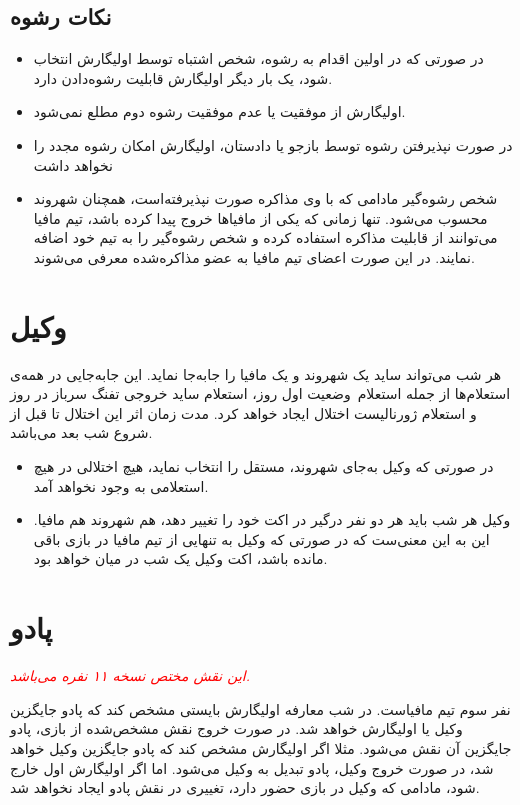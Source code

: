 \documentclass[12pt]{extarticle}
\begin{document}
\subsection{نکات رشوه}
\begin{itemize}
	\item
	      در صورتی که در اولین اقدام به رشوه، شخص اشتباه توسط اولیگارش انتخاب شود، یک بار دیگر اولیگارش قابلیت رشوه‌دادن دارد.
	\item
	      اولیگارش از موفقیت یا عدم موفقیت رشوه دوم مطلع نمی‌شود.
	\item
	      در صورت نپذیرفتن رشوه توسط بازجو یا دادستان، اولیگارش امکان رشوه مجدد را نخواهد داشت
	\item
	      شخص رشوه‌گیر مادامی که با وی مذاکره صورت نپذیرفته‌است، همچنان شهروند محسوب می‌شود. تنها زمانی که یکی از مافیاها خروج پیدا کرده باشد، تیم مافیا می‌توانند از قابلیت مذاکره استفاده کرده و شخص رشوه‌گیر را به تیم خود اضافه نمایند. در این صورت اعضای تیم مافیا به عضو مذاکره‌شده معرفی می‌شوند.
\end{itemize}

\section{وکیل}
هر شب می‌تواند ساید یک شهروند و یک مافیا را جابه‌جا نماید. این جابه‌جایی در همه‌ی استعلام‌ها از جمله استعلام~وضعیت اول روز، استعلام ساید خروجی تفنگ سرباز در روز و استعلام ژورنالیست اختلال ایجاد خواهد کرد. مدت زمان اثر این اختلال تا قبل از شروع شب بعد می‌باشد.

\begin{itemize}
	\item
	      در صورتی که وکیل به‌جای شهروند، مستقل را انتخاب نماید، هیچ اختلالی در هیچ استعلامی به وجود نخواهد آمد.
	\item
	      وکیل هر شب باید هر دو نفر درگیر در اکت خود را تغییر دهد، هم شهروند هم مافیا. این به این معنی‌ست که در صورتی که وکیل به تنهایی از تیم مافیا در بازی باقی مانده باشد، اکت وکیل یک شب در میان خواهد بود.
\end{itemize}

\section{پادو}
\textit{\textcolor{red}{
		این نقش مختص نسخه ۱۱ نفره می‌باشد.
	}}

نفر سوم تیم مافیاست. در شب معارفه اولیگارش بایستی مشخص کند که پادو جایگزین وکیل یا اولیگارش خواهد شد. در صورت خروج نقش مشخص‌شده از بازی، پادو جایگزین آن نقش می‌شود. مثلا اگر اولیگارش مشخص کند که پادو جایگزین وکیل خواهد شد، در صورت خروج وکیل، پادو تبدیل به وکیل می‌شود. اما اگر اولیگارش اول خارج شود، مادامی که وکیل در بازی حضور دارد، تغییری در نقش پادو ایجاد نخواهد شد.
\end{document}
